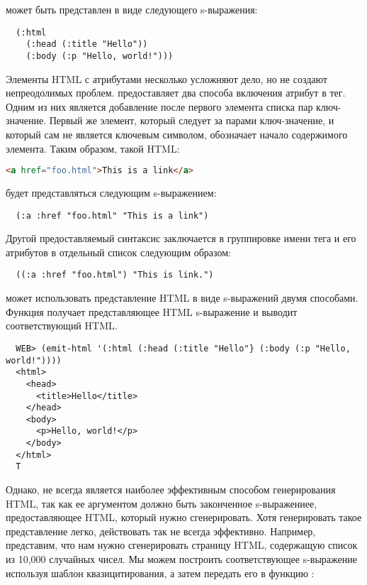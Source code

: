 может быть представлен в виде следующего s-выражения:

\begin{lstlisting}
  (:html
    (:head (:title "Hello"))
    (:body (:p "Hello, world!")))
\end{lstlisting}

Элементы HTML с атрибутами несколько усложняют дело, но не создают непреодолимых
проблем.  предоставляет два способа включения атрибут в тег. Одним из них
является добавление после первого элемента списка пар ключ-значение. Первый же элемент,
который следует за парами ключ-значение, и который сам не является ключевым символом,
обозначает начало содержимого элемента. Таким образом, такой HTML:

\begin{lstlisting}[language=HTML]
  <a href="foo.html">This is a link</a>
\end{lstlisting}

будет представляться следующим s-выражением:

\begin{lstlisting}
  (:a :href "foo.html" "This is a link")
\end{lstlisting}

Другой предоставляемый  синтаксис заключается в группировке имени тега и его
атрибутов в отдельный список следующим образом:

\begin{lstlisting}
  ((:a :href "foo.html") "This is link.")
\end{lstlisting}

 может использовать представление HTML в виде s-выражений двумя
способами. Функция  получает представляющее HTML s-выражение и выводит
соответствующий HTML.

\begin{lstlisting}
  WEB> (emit-html '(:html (:head (:title "Hello"} (:body (:p "Hello, world!"))))
  <html>
    <head>
      <title>Hello</title>
    </head>
    <body>
      <p>Hello, world!</p>
    </body>
  </html>
  T
\end{lstlisting}

Однако,  не всегда является наиболее эффективным способом генерирования
HTML, так как ее аргументом должно быть законченное s-выражениее, предоставляющее HTML,
который нужно сгенерировать. Хотя генерировать такое представление легко, действовать так
не всегда эффективно. Например, представим, что нам нужно сгенерировать страницу HTML,
содержащую список из 10,000 случайных чисел. Мы можем построить соответствующее
s-выражение используя шаблон квазицитирования, а затем передать его в функцию
:

